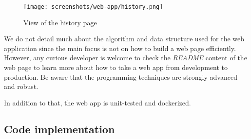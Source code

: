 \begin{figure}[ht!]
    \centering
    \texttt{[image: screenshots/web-app/history.png]}
    \caption{View of the history page}
    \label{fig:ui-history}
\end{figure}

We do not detail much about the algorithm and data structure used for the web application since the main focus is not on how to build a web page efficiently. However, any curious developer is welcome to check the \textit{README} content of the web page to learn more about how to take a web app from development to production. Be aware that the programming techniques are strongly advanced and robust.

In addition to that, the web app is unit-tested and dockerized.

\subsection{Code implementation}
